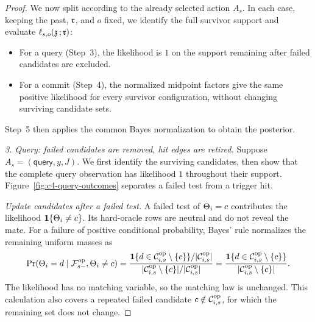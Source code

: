 \begin{proof}
We now split according to the already selected action \(A_s\).
In each case, keeping the past, \(\mathfrak r\), and \(o\) fixed,
we identify the full survivor support and evaluate
\(\ell_{s,o}(\mathfrak z\,;\mathfrak r)\):
\begin{itemize}
\item For a query (Step~3), the likelihood is \(1\) on the support
remaining after failed candidates are excluded.
\item For a commit (Step~4), the normalized midpoint factors give the
same positive likelihood for every survivor configuration, without
changing surviving candidate sets.
\end{itemize}
Step~5 then applies the common Bayes normalization to obtain the posterior.


\emph{3. Query: failed candidates are removed, hit edges are retired.}
Suppose \(A_s=(\mathsf{query},y,J)\). We first identify the surviving
candidates, then show that the complete query observation has likelihood
\(1\) throughout their support.
Figure~\ref{fig:c4-query-outcomes} separates a failed test from a trigger hit.


\emph{Update candidates after a failed test.}
A failed test of \(\Theta_{i}=c\) contributes the likelihood
\(\mathbf 1\{\Theta_{i}\ne c\}\).  Its hard-oracle rows are neutral and
do not reveal the mate.  For a failure of positive conditional probability,
Bayes' rule normalizes the remaining uniform masses as
\[
 \Pr(\Theta_{i}=d\mid\mathcal F^{\mathrm{op}}_{s-},\Theta_{i}\ne c)
 =\frac{\mathbf 1\{d\in\mathcal C^{\mathrm{op}}_{i,s}\setminus\{c\}\}/|\mathcal C^{\mathrm{op}}_{i,s}|}
        {|\mathcal C^{\mathrm{op}}_{i,s}\setminus\{c\}|/|\mathcal C^{\mathrm{op}}_{i,s}|}
 =\frac{\mathbf 1\{d\in\mathcal C^{\mathrm{op}}_{i,s}\setminus\{c\}\}}
        {|\mathcal C^{\mathrm{op}}_{i,s}\setminus\{c\}|}.
\]
The likelihood has no matching variable, so the matching law is unchanged.
This calculation also covers a repeated failed candidate \(c\notin\mathcal C^{\mathrm{op}}_{i,s}\),
for which the remaining set does not change.



\end{proof}
